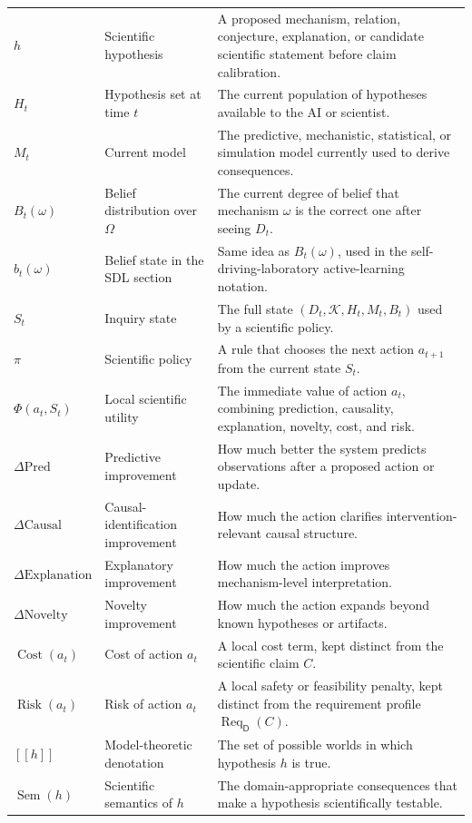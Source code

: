 \documentclass[11pt,a4paper]{article}
\newcommand{\Sem}{\operatorname{Sem}}
\newcommand{\denote}[1]{\left[\!\left[#1\right]\!\right]}
\newcommand{\Know}{\mathcal{K}}
\newcommand{\Req}{\operatorname{Req}}
\newcommand{\Cost}{\operatorname{Cost}}
\newcommand{\Risk}{\operatorname{Risk}}
\newcommand{\Dom}{\mathsf{D}}
\begin{document}
{\begin{longtable}{@{}p{2.8cm}p{4.1cm}p{6.4cm}@{}}
$h$ & Scientific hypothesis & A proposed mechanism, relation, conjecture, explanation, or candidate scientific statement before claim calibration. \\
$H_t$ & Hypothesis set at time $t$ & The current population of hypotheses available to the AI or scientist. \\
$M_t$ & Current model & The predictive, mechanistic, statistical, or simulation model currently used to derive consequences. \\
$B_t(\omega)$ & Belief distribution over $\Omega$ & The current degree of belief that mechanism $\omega$ is the correct one after seeing $D_t$. \\
$b_t(\omega)$ & Belief state in the SDL section & Same idea as $B_t(\omega)$, used in the self-driving-laboratory active-learning notation. \\
$S_t$ & Inquiry state & The full state $(D_t,\Know,H_t,M_t,B_t)$ used by a scientific policy. \\
$\pi$ & Scientific policy & A rule that chooses the next action $a_{t+1}$ from the current state $S_t$. \\
$\Phi(a_t,S_t)$ & Local scientific utility & The immediate value of action $a_t$, combining prediction, causality, explanation, novelty, cost, and risk. \\
$\Delta\mathrm{Pred}$ & Predictive improvement & How much better the system predicts observations after a proposed action or update. \\
$\Delta\mathrm{Causal}$ & Causal-identification improvement & How much the action clarifies intervention-relevant causal structure. \\
$\Delta\mathrm{Explanation}$ & Explanatory improvement & How much the action improves mechanism-level interpretation. \\
$\Delta\mathrm{Novelty}$ & Novelty improvement & How much the action expands beyond known hypotheses or artifacts. \\
$\Cost(a_t)$ & Cost of action $a_t$ & A local cost term, kept distinct from the scientific claim $C$. \\
$\Risk(a_t)$ & Risk of action $a_t$ & A local safety or feasibility penalty, kept distinct from the requirement profile $\Req_{\Dom}(C)$. \\
$\denote{h}$ & Model-theoretic denotation & The set of possible worlds in which hypothesis $h$ is true. \\
$\Sem(h)$ & Scientific semantics of $h$ & The domain-appropriate consequences that make a hypothesis scientifically testable. \\

\end{longtable}}
\end{document}
